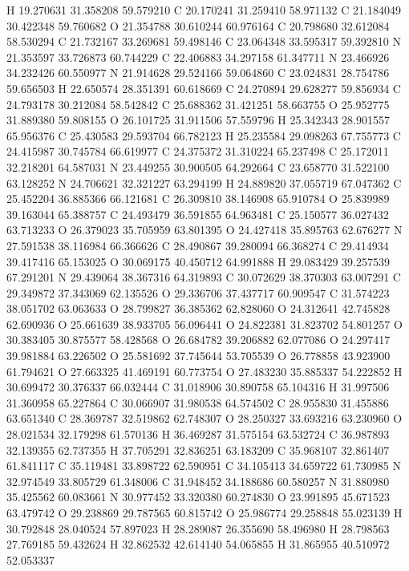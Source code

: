\documentclass{article}
\begin{document}
H 19.270631 31.358208 59.579210
C 20.170241 31.259410 58.971132
C 21.184049 30.422348 59.760682
O 21.354788 30.610244 60.976164
C 20.798680 32.612084 58.530294
C 21.732167 33.269681 59.498146
C 23.064348 33.595317 59.392810
N 21.353597 33.726873 60.744229
C 22.406883 34.297158 61.347711
N 23.466926 34.232426 60.550977
N 21.914628 29.524166 59.064860
C 23.024831 28.754786 59.656503
H 22.650574 28.351391 60.618669
C 24.270894 29.628277 59.856934
C 24.793178 30.212084 58.542842
C 25.688362 31.421251 58.663755
O 25.952775 31.889380 59.808155
O 26.101725 31.911506 57.559796
H 25.342343 28.901557 65.956376
C 25.430583 29.593704 66.782123
H 25.235584 29.098263 67.755773
C 24.415987 30.745784 66.619977
C 24.375372 31.310224 65.237498
C 25.172011 32.218201 64.587031
N 23.449255 30.900505 64.292664
C 23.658770 31.522100 63.128252
N 24.706621 32.321227 63.294199
H 24.889820 37.055719 67.047362
C 25.452204 36.885366 66.121681
C 26.309810 38.146908 65.910784
O 25.839989 39.163044 65.388757
C 24.493479 36.591855 64.963481
C 25.150577 36.027432 63.713233
O 26.379023 35.705959 63.801395
O 24.427418 35.895763 62.676277
N 27.591538 38.116984 66.366626
C 28.490867 39.280094 66.368274
C 29.414934 39.417416 65.153025
O 30.069175 40.450712 64.991888
H 29.083429 39.257539 67.291201
N 29.439064 38.367316 64.319893
C 30.072629 38.370303 63.007291
C 29.349872 37.343069 62.135526
O 29.336706 37.437717 60.909547
C 31.574223 38.051702 63.063633
O 28.799827 36.385362 62.828060
O 24.312641 42.745828 62.690936
O 25.661639 38.933705 56.096441
O 24.822381 31.823702 54.801257
O 30.383405 30.875577 58.428568
O 26.684782 39.206882 62.077086
O 24.297417 39.981884 63.226502
O 25.581692 37.745644 53.705539
O 26.778858 43.923900 61.794621
O 27.663325 41.469191 60.773754
O 27.483230 35.885337 54.222852
H 30.699472 30.376337 66.032444
C 31.018906 30.890758 65.104316
H 31.997506 31.360958 65.227864
C 30.066907 31.980538 64.574502
C 28.955830 31.455886 63.651340
C 28.369787 32.519862 62.748307
O 28.250327 33.693216 63.230960
O 28.021534 32.179298 61.570136
H 36.469287 31.575154 63.532724
C 36.987893 32.139355 62.737355
H 37.705291 32.836251 63.183209
C 35.968107 32.861407 61.841117
C 35.119481 33.898722 62.590951
C 34.105413 34.659722 61.730985
N 32.974549 33.805729 61.348006
C 31.948452 34.188686 60.580257
N 31.880980 35.425562 60.083661
N 30.977452 33.320380 60.274830
O 23.991895 45.671523 63.479742
O 29.238869 29.787565 60.815742
O 25.986774 29.258848 55.023139
H 30.792848 28.040524 57.897023
H 28.289087 26.355690 58.496980
H 28.798563 27.769185 59.432624
H 32.862532 42.614140 54.065855
H 31.865955 40.510972 52.053337
\end{document}
